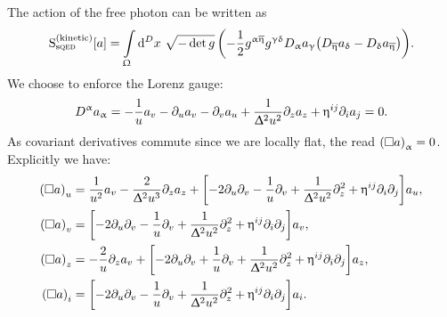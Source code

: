 The action of the free photon can be written as
\begin{align}
  \rS_{\text{s}\qed}^{(\text{kinetic})}\qty[ a ]
  =
  \int\limits_{\Omega} \dd[D]{x}\,
  \sqrt{-\det g}\,
  \qty(%
   - \frac{1}{2} g^{\alpha\beta} g^{\gamma\delta}
   D_{\alpha} a_{\gamma} \qty( D_{\beta} a_{\delta} - D_{\delta} a_{\beta})
  ).
\end{align}
We choose to enforce the Lorenz gauge:\footnotemark{}
\begin{equation}
  D^{\upalpha} a_{\upalpha}
  =
  - \frac{1}{u} a_{v}
  - \partial_{u} a_{v}
  - \partial_{v} a_{u}
  + \frac{1}{\Updelta^2 u^2} \partial_{z} a_z
  + \upeta^{ij} \partial_{i} a_j
  =
  0.
  \label{eq:Lorenz_gauge}
\end{equation}
As covariant derivatives commute since we are locally flat, the \eom read $\qty(\square a)_{\upalpha} = 0$.
Explicitly we have:
\begin{equation}
  \begin{split}
    \qty( \square a )_u
    & =
    \frac{1}{u^2} a_{v}
    -
    \frac{2}{\Updelta^2 u^3} \partial_{z} a_z
    +
    \qty[
      -
      2 \partial_{u} \partial_{v}
      -
      \frac{1}{u} \partial_{v}
      +
      \frac{1}{\Updelta^2 u^2} \partial_{z}^2
      +
      \upeta^{ij} \partial_{i} \partial_{j}
    ]
    a_u,
    \\
    \qty( \square a )_v
    & =
    \qty[
    -
      2 \partial_{u} \partial_{v}
      -
      \frac{1}{u} \partial_{v}
      +
      \frac{1}{\Updelta^2 u^2} \partial_{z}^2
      +
      \upeta^{ij} \partial_{i} \partial_{j}
    ]
    a_v,
    \\
    \qty( \square a )_z
    & =
    -
    \frac{2}{u} \partial_{z} a_v
    +
    \qty[
      -
      2 \partial_{u} \partial_{v}
      +
      \frac{1}{u} \partial_{v}
      +
      \frac{1}{\Updelta^2 u^2} \partial_{z}^2
      +
      \upeta^{ij} \partial_{i} \partial_{j}
    ]
    a_z,
    \\
    \qty( \square a )_i
    & =
    \qty[
      -
      2 \partial_{u} \partial_{v}
      -
      \frac{1}{u} \partial_{v}
      +
      \frac{1}{\Updelta^2 u^2} \partial_{z}^2
      +
      \upeta^{ij} \partial_{i} \partial_{j}
    ]
    a_i.
  \end{split}
\end{equation}

